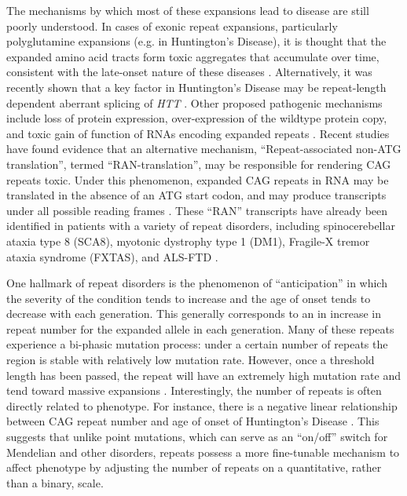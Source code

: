 
The mechanisms by which most of these expansions lead to disease are still poorly understood. In cases of exonic repeat expansions, particularly polyglutamine expansions (e.g. in Huntington's Disease), it is thought that the expanded amino acid tracts form toxic aggregates that accumulate over time, consistent with the late-onset nature of these diseases \cite{MichalikVanBroeckhoven2003}. Alternatively, it was recently shown that a key factor in Huntington's Disease may be repeat-length dependent aberrant splicing of \emph{HTT} \cite{SathasivamNeuederGipsonEtAl2013}. Other proposed pathogenic mechanisms include loss of protein expression, over-expression of the wildtype protein copy, and toxic gain of function of RNAs encoding expanded repeats \cite{Pearson2011}. Recent studies have found evidence that an alternative mechanism, ``Repeat-associated non-ATG translation'', termed ``RAN-translation'', may be responsible for rendering CAG repeats toxic. Under this phenomenon, expanded CAG repeats in RNA may be translated in the absence of an ATG start codon, and may produce transcripts under all possible reading frames \cite{Pearson2011}. These ``RAN'' transcripts have already been identified in patients with a variety of repeat disorders, including spinocerebellar ataxia type 8 (SCA8), myotonic dystrophy type 1 (DM1), Fragile-X tremor ataxia syndrome (FXTAS), and ALS-FTD \cite{ClearyRanum2014}.

One hallmark of repeat disorders is the phenomenon of ``anticipation'' in which the severity of the condition tends to increase and the age of onset tends to decrease with each generation. This generally corresponds to an in increase in repeat number for the expanded allele in each generation. Many of these repeats experience a bi-phasic mutation process: under a certain number of repeats the region is stable with relatively low mutation rate. However, once a threshold length has been passed, the repeat will have an extremely high mutation rate and tend toward massive expansions \cite{BourgeoisCoffeyRiveraEtAl2009}. Interestingly, the number of repeats is often directly related to phenotype. For instance, there is a negative linear relationship between CAG repeat number and age of onset of Huntington's Disease \cite{Rubinsztein2002}. This suggests that unlike point mutations, which can serve as an ``on/off'' switch for Mendelian and other disorders, repeats possess a more fine-tunable mechanism to affect phenotype by adjusting the number of repeats on a quantitative, rather than a binary, scale.

